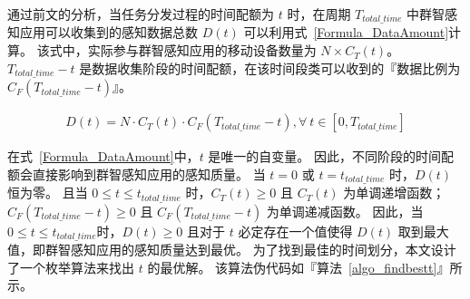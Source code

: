 通过前文的分析，当任务分发过程的时间配额为 $t$ 时，在周期 $T_{total\_time}$ 中群智感知应用可以收集到的感知数据总数 $D(t)$ 可以利用式~\eqref{Formula_DataAmount}计算。
该式中，实际参与群智感知应用的移动设备数量为 $N\times C_T(t)$。
$T_{total\_time}-t$ 是数据收集阶段的时间配额，在该时间段类可以收到的『数据比例为 $C_F(T_{total\_time}-t)$』。

\begin{equation}
  \label{Formula_DataAmount}
  \begin{gathered}
  D(t) = N \cdot C_T(t) \cdot C_F(T_{total\_time}-t),\forall \ t \in [0, T_{total\_time}]
  \end{gathered}
\end{equation}

在式~\eqref{Formula_DataAmount}中，$t$ 是唯一的自变量。
因此，不同阶段的时间配额会直接影响到群智感知应用的感知质量。
当 $t=0$ 或 $t=t_{total\_time}$ 时，$D(t)$ 恒为零。
且当 $0 \leq t \leq t_{total\_time}$ 时，$C_T(t)\geq 0$ 且 $C_T(t)$ 为单调递增函数；$C_F(T_{total\_time}-t) \geq 0$ 且 $C_F(T_{total\_time}-t)$ 为单调递减函数。
因此，当$0 \leq t \leq t_{total\_time}$时，$D(t) \geq 0$ 且对于 $t$ 必定存在一个值使得 $D(t)$ 取到最大值，即群智感知应用的感知质量达到最优。
为了找到最佳的时间划分，本文设计了一个枚举算法来找出 $t$ 的最优解。
该算法伪代码如『算法~\ref{algo_findbestt}』所示。



